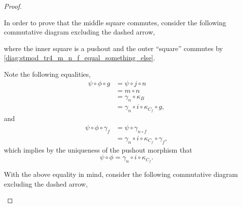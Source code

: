 \begin{proof}
\begin{enumerate}[label={(\bfseries TR\arabic*)}]
{            In order to prove that the middle square commutes, consider the following commutative diagram excluding the dashed arrow,
            \begin{center}
            \end{center}
            where the inner square is a pushout and the outer ``square'' commutes by \autoref{diag:stmod_tr4_m_n_f_equal_something_else}.

            Note the following equalities,
            \begin{align*}
                \psi \circ \phi \circ g &= \psi \circ j \circ n \\
                &= m \circ n \\
                &= \gamma_n \circ \kappa_B \\
                &= \gamma_n \circ i \circ \kappa_{C_f} \circ g,
            \end{align*}
            and
            \begin{align*}
                \psi \circ \phi \circ \gamma_f &= \psi \circ \gamma_{n \circ f} \\
                &= \gamma_n \circ i \circ \kappa_{C_f} \circ \gamma_f,
            \end{align*}
            which implies by the uniqueness of the pushout morphism that
            \[
                \psi \circ \phi = \gamma_n \circ i \circ \kappa_{C_f}.
            \]

            With the above equality in mind, consider the following commutative diagram excluding the dashed arrow,
            \begin{center}
\end{center}}
\end{enumerate}
\end{proof}
